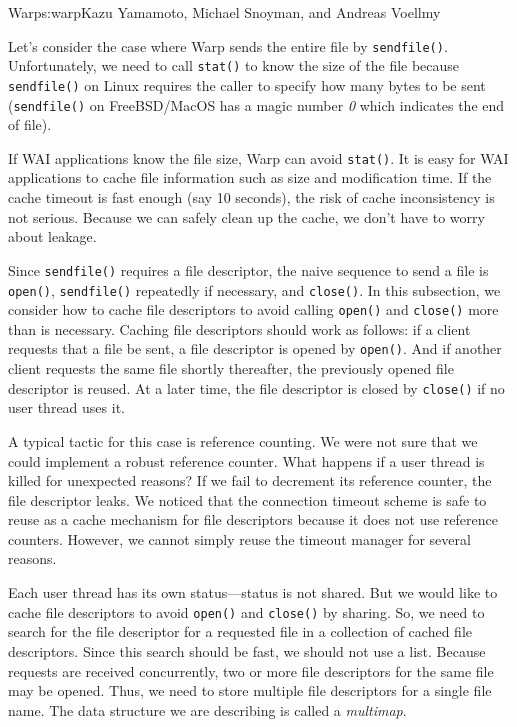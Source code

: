 \begin{aosachapter}{Warp}{s:warp}{Kazu Yamamoto, Michael Snoyman, and Andreas Voellmy}

\label{sec.warp.timers}

Let's consider the case where Warp sends the entire file by
\texttt{sendfile()}. Unfortunately, we need to call \texttt{stat()} to
know the size of the file because \texttt{sendfile()} on Linux requires
the caller to specify how many bytes to be sent (\texttt{sendfile()} on
FreeBSD/MacOS has a magic number \emph{0} which indicates the end of
file).

If WAI applications know the file size, Warp can avoid \texttt{stat()}.
It is easy for WAI applications to cache file information such as size
and modification time. If the cache timeout is fast enough (say 10
seconds), the risk of cache inconsistency is not serious. Because we can
safely clean up the cache, we don't have to worry about leakage.

Since \texttt{sendfile()} requires a file descriptor, the naive sequence
to send a file is \texttt{open()}, \texttt{sendfile()} repeatedly if
necessary, and \texttt{close()}. In this subsection, we consider how to
cache file descriptors to avoid calling \texttt{open()} and
\texttt{close()} more than is necessary. Caching file descriptors should
work as follows: if a client requests that a file be sent, a file
descriptor is opened by \texttt{open()}. And if another client requests
the same file shortly thereafter, the previously opened file descriptor
is reused. At a later time, the file descriptor is closed by
\texttt{close()} if no user thread uses it.

A typical tactic for this case is reference counting. We were not sure
that we could implement a robust reference counter. What happens if a
user thread is killed for unexpected reasons? If we fail to decrement
its reference counter, the file descriptor leaks. We noticed that the
connection timeout scheme is safe to reuse as a cache mechanism for file
descriptors because it does not use reference counters. However, we
cannot simply reuse the timeout manager for several reasons.

Each user thread has its own status---status is not shared. But we would
like to cache file descriptors to avoid \texttt{open()} and
\texttt{close()} by sharing. So, we need to search for the file
descriptor for a requested file in a collection of cached file
descriptors. Since this search should be fast, we should not use a list.
Because requests are received concurrently, two or more file descriptors
for the same file may be opened. Thus, we need to store multiple file
descriptors for a single file name. The data structure we are describing
is called a \emph{multimap}.


\end{aosachapter}
